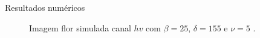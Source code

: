 \documentclass[10pt]{beamer}
\begin{document}
\begin{frame}{Resultados numéricos}
\begin{figure}[hbt]
	\caption{Imagem flor simulada canal $hv$ com $\beta = 25$, $\delta = 155$ e $\nu = 5$ .}
\label{cap_acf_fig15}
\endminipage\hfill
{}

\end{figure}
\end{frame}
\end{document}
